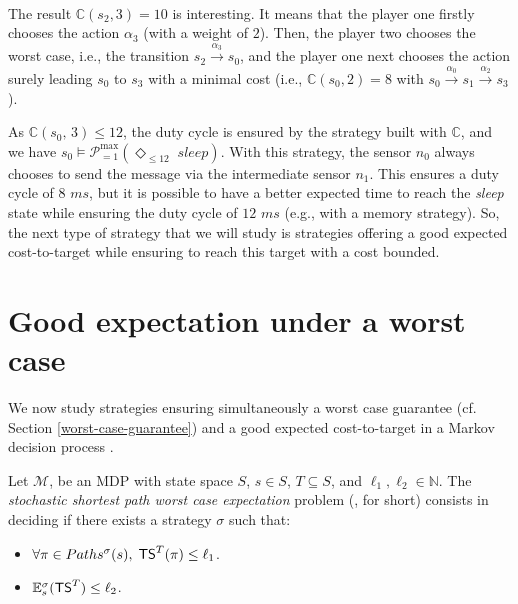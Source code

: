 \begin{example}
\begin{minipage}{0.5\linewidth}
\end{minipage}
\\$ $\\$ $\\
The result $\mathbb{C}(s_2,3)=10$ is interesting. It means that the player one firstly chooses the action $\alpha_3$ (with a weight of $2$).
Then, the player two chooses the worst case, i.e., the transition $s_2 \xrightarrow{\alpha_3}s_0$, and the player one next chooses the action surely leading $s_0$ to $s_3$ with a minimal cost (i.e., $\mathbb{C}(s_0, 2)=8$ with $s_0\xrightarrow{\alpha_0}s_1\xrightarrow{\alpha_2}s_3$).
\par As $\mathbb{C}(s_0,\, 3) \leq 12$, the duty cycle is ensured by the strategy built with $\mathbb{C}$, and we have $s_0 \models \mathcal{P}^{\max}_{=1}(\Diamond_{\leq 12}\; \textit{sleep})$.
With this strategy, the sensor $n_0$ always chooses to send the message via the intermediate sensor $n_1$.
This ensures a duty cycle of $8$ $ms$, but it is possible to have a better expected time to reach the \textit{sleep} state while ensuring the duty cycle of $12$ $ms$ (e.g., with a memory strategy).
So, the next type of strategy that we will study is strategies offering a good expected cost-to-target while ensuring to reach this target with a cost bounded.
\end{example}

\section{Good expectation under a worst case}
We now study strategies ensuring simultaneously a worst case guarantee (cf. Section \ref{worst-case-guarantee}) and a good expected cost-to-target in a Markov decision process \cite{DBLP:journals/corr/RandourRS14a,DBLP:journals/corr/BruyereFRR13}.
\begin{definition}
    Let $\mathcal{M}$, be an MDP with state space $S$, $s \in S$, $T \subseteq S$, and $\ell_1, \ell_2 \in \mathbb{N}$.
    The \textit{stochastic shortest path worst case expectation} problem (\SSPWE{}, for short) consists in deciding if there exists a strategy $\sigma$ such that:
    \begin{itemize}
      \item $\forall \pi \in Paths^\sigma(s), \; \text{\sffamily TS}^T(\pi) \leq \ell_1$.
      \item $\mathbb{E}_s^\sigma(\text{\sffamily TS}^T) \leq \ell_2$.
    \end{itemize}
\end{definition}

